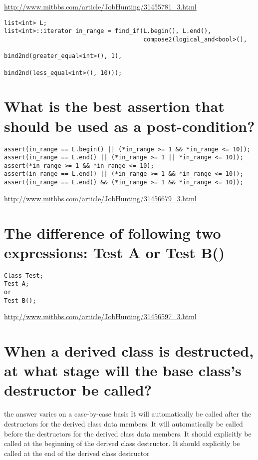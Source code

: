 \documentclass[12pt]{book}
\begin{document}
\url{http://www.mitbbs.com/article/JobHunting/31455781_3.html}

\lstset{language=java,label= ,caption= ,numbers=none}
\begin{lstlisting}
list<int> L;
list<int>::iterator in_range = find_if(L.begin(), L.end(),
                                       compose2(logical_and<bool>(),
                                                bind2nd(greater_equal<int>(), 1),
                                                bind2nd(less_equal<int>(), 10)));
\end{lstlisting}
\section{What is the best assertion that should be used as a post-condition?}
\label{sec-13-5}
\lstset{language=java,label= ,caption= ,numbers=none}
\begin{lstlisting}
assert(in_range == L.begin() || (*in_range >= 1 && *in_range <= 10));
assert(in_range == L.end() || (*in_range >= 1 || *in_range <= 10));
assert(*in_range >= 1 && *in_range <= 10);
assert(in_range == L.end() || (*in_range >= 1 && *in_range <= 10));
assert(in_range == L.end() && (*in_range >= 1 && *in_range <= 10));
\end{lstlisting}

\url{http://www.mitbbs.com/article/JobHunting/31456679_3.html}

\section{The difference of following two expressions: Test A or Test B()}
\label{sec-13-6}
\lstset{language=java,label= ,caption= ,numbers=none}
\begin{lstlisting}
Class Test;
Test A;
or
Test B();
\end{lstlisting}

\url{http://www.mitbbs.com/article/JobHunting/31456597_3.html}

\section{When a derived class is destructed, at what stage will the base class's destructor be called?}
\label{sec-13-7}
the answer varies on a case-by-case basis
It will automatically be called after the destructors for the derived class data members. It will automatically be called before the destructors for the derived class data members. It should explicitly be called at the beginning of the derived class destructor. It should explicitly be called at the end of the derived class destructor
\end{document}
